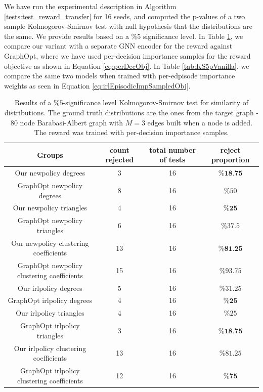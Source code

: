 \documentclass{report}
\numberwithin{equation}{section}
\numberwithin{figure}{section}
\numberwithin{table}{section}
\numberwithin{algorithm}{section}
\begin{document}
We have run the experimental description in Algorithm 
\ref{tests:test_reward_transfer} for 16 seeds, 
and computed the p-values 
of a two sample Kolmogorov-Smirnov \citep{KStest3} test 
with null hypothesis that the distributions are the same.
We provide results based on a $\%5$ significance 
level. In Table \ref{tab:KS5pPerDec}, 
we compare our variant with a separate GNN encoder for 
the reward against GraphOpt, where we have used per-decision 
importance samples for the reward objective as shown in Equation 
\ref{eq:perDecObj}. In Table \ref{tab:KS5pVanilla}, 
we compare the same two models when 
trained with per-edpisode importance weights as seen in 
Equation \ref{eq:irlEpisodicImpSampledObj}.


\begin{table}[!h]
  \begin{center}
    \caption{\label{tab:KS5pPerDec} 
    Results of a $\%5$-significance level 
    Kolmogorov-Smirnov 
    test for similarity of distributions. 
    The ground truth distributions are the ones 
    from the target graph - 80 node Barabasi-Albert graph 
    with $M=3$ edges built when a node is added. The 
    reward was trained with per-decision importance samples.}
    \begin{tabular}{|c|c|c|c|}
      \hline
      \textbf{Groups} & \textbf{count rejected} & \textbf{total number of tests} & \textbf{reject proportion}\\
      \hline
      Our newpolicy degrees & 3 & 16 & $\%\textbf{18.75}$\\
      GraphOpt newpolicy degrees & 8 & 16 & $\%50$\\
      \hline
      Our newpolicy triangles & 4 & 16 & $\%\textbf{25}$\\
      GraphOpt newpolicy triangles & 6 & 16 & $\%37.5$\\
      \hline
      Our newpolicy clustering coefficients & 13 & 16 & $\%\textbf{81.25}$\\
      GraphOpt newpolicy clustering coefficients & 15 & 16 & $\%93.75$\\
      \hline
      Our irlpolicy degrees & 5 & 16 & $\%31.25$\\
      GraphOpt irlpolicy degrees & 4 & 16 & $\%\textbf{25}$\\
      \hline
      Our irlpolicy triangles & 4 & 16 & $\%25$\\
      GraphOpt irlpolicy triangles & 3 & 16 & $\%\textbf{18.75}$\\
      \hline
      Our irlpolicy clustering coefficients & 13 & 16 & $\%81.25$\\
      GraphOpt irlpolicy clustering coefficients & 12 & 16 & $\%\textbf{75}$\\
      \hline
    \end{tabular}
  \end{center}
\end{table}
\end{document}
